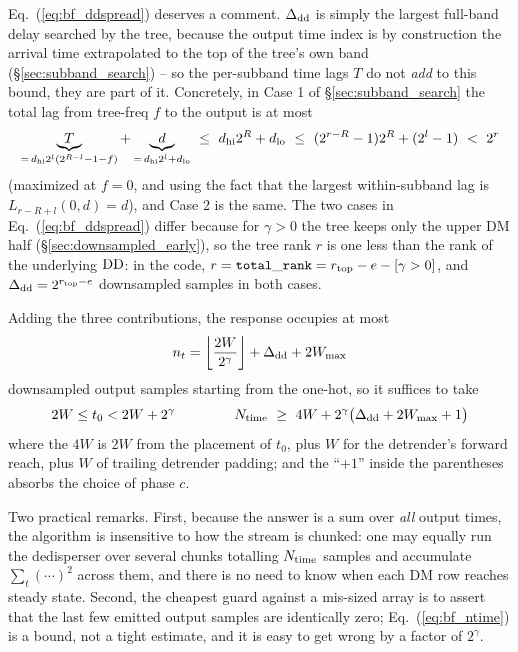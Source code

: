 \documentclass{article}
\numberwithin{equation}{section}   %
\def\DD{{\rm DD}}
\begin{document}
\par\noindent
Eq.\ (\ref{eq:bf_ddspread}) deserves a comment. $\Delta_{\rm dd}$ is simply the largest full-band
delay searched by the tree, because the output time index is by construction the arrival time
extrapolated to the top of the tree's own band (\S\ref{sec:subband_search}) -- so the per-subband
time lags $T$ do not {\em add} to this bound, they are part of it. Concretely, in Case 1 of
\S\ref{sec:subband_search} the total lag from tree-freq $f$ to the output is at most
\begin{equation}
\underbrace{T}_{= \, d_{\rm hi}2^l(2^{R-l}-1-f)} + \underbrace{d}_{= \, d_{\rm hi}2^l + d_{\rm lo}}
\ \le \ d_{\rm hi} 2^R + d_{\rm lo} \ \le \ (2^{r-R}-1)2^R + (2^l-1) \ < \ 2^r
\end{equation}
(maximized at $f=0$, and using the fact that the largest within-subband lag is
$L_{r-R+l}(0,d) = d$), and Case 2 is the same. The two cases in Eq.\ (\ref{eq:bf_ddspread}) differ
because for $\gamma>0$ the tree keeps only the upper DM half (\S\ref{sec:downsampled_early}), so
the tree rank $r$ is one less than the rank of the underlying $\DD$: in the code,
$r = {\tt total\_rank} = r_{\rm top} - e - [\gamma>0]$, and $\Delta_{\rm dd} = 2^{r_{\rm top}-e}$
downsampled samples in both cases.

Adding the three contributions, the response occupies at most
\begin{equation}
n_t = \left\lfloor \frac{2W}{2^\gamma} \right\rfloor + \Delta_{\rm dd} + 2 W_{\rm max}
\end{equation}
downsampled output samples starting from the one-hot, so it suffices to take
\begin{equation}
2W \le t_0 < 2W + 2^\gamma
  \hspace{1.5cm}
N_{\rm time} \ \ge \ 4W + 2^\gamma \big( \Delta_{\rm dd} + 2W_{\rm max} + 1 \big)
\label{eq:bf_ntime}
\end{equation}
where the $4W$ is $2W$ from the placement of $t_0$, plus $W$ for the detrender's forward reach,
plus $W$ of trailing detrender padding; and the ``$+1$'' inside the parentheses absorbs the choice
of phase $c$.

Two practical remarks. First, because the answer is a sum over {\em all} output times, the
algorithm is insensitive to how the stream is chunked: one may equally run the dedisperser over
several chunks totalling $N_{\rm time}$ samples and accumulate $\sum_t(\cdots)^2$ across them, and
there is no need to know when each DM row reaches steady state. Second, the cheapest guard against
a mis-sized array is to assert that the last few emitted output samples are identically zero;
Eq.\ (\ref{eq:bf_ntime}) is a bound, not a tight estimate, and it is easy to get wrong by a factor
of $2^\gamma$.
\end{document}
